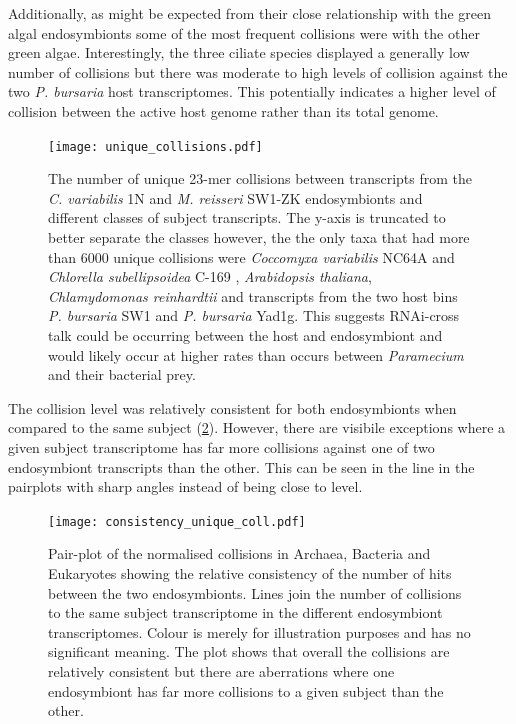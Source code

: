 Additionally, as might be expected from their close relationship with the 
green algal endosymbionts some of the most frequent collisions were 
with the other green algae.
Interestingly, the three ciliate species displayed a generally low number of collisions 
but there was moderate to high levels of collision against the two
\textit{P. bursaria} host transcriptomes.  This potentially
indicates a higher level of collision between the active host genome 
rather than its total genome.

\begin{figure}
    \texttt{[image: unique\_collisions.pdf]}
    \caption[Unique eDicer Collisions by Subject Class]{The number of unique 23-mer
        collisions 
        between transcripts from the \textit{C. variabilis} 1N
    and \textit{M. reisseri} SW1-ZK endosymbionts and different
classes of subject transcripts.  The y-axis is truncated to better
separate the classes however, the the only taxa that had more than 6000
unique collisions were \textit{Coccomyxa variabilis} NC64A and \textit{Chlorella subellipsoidea} C-169
, \textit{Arabidopsis thaliana}, \textit{Chlamydomonas reinhardtii} and transcripts
from the two host bins \textit{P. bursaria} SW1 and \textit{P. bursaria} Yad1g.  
This suggests RNAi-cross talk could be occurring between the host and endosymbiont
and would likely occur at higher rates than occurs between \textit{Paramecium}
and their bacterial prey.}
\label{fig:unique_collisions}
\end{figure}

The collision level was relatively consistent for both endosymbionts
when compared to the same subject (\cref{fig:consistency_most}). 
However, there are visibile exceptions where a given subject
transcriptome has far more collisions against one of two
endosymbiont transcripts than the other.  This can be seen
in the line in the pairplots with sharp angles instead of
being close to level. 

\begin{figure}
    \centering
    \texttt{[image: consistency\_unique\_coll.pdf]}
    \caption[Pair-plot of Normalised Collisions in Both Endosymbiont]
    {Pair-plot of the normalised collisions in Archaea, Bacteria
    and Eukaryotes showing the relative consistency of the
number of hits between the two endosymbionts.  Lines join the number
of collisions to the same subject transcriptome in the different
endosymbiont transcriptomes.  Colour is merely for illustration
purposes and has no significant meaning.
The plot shows that overall the collisions are relatively consistent but there
are aberrations where one endosymbiont has far more collisions
to a given subject than the other.}
    \label{fig:consistency_most}
\end{figure}

